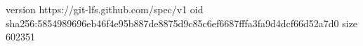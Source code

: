version https://git-lfs.github.com/spec/v1
oid sha256:5854989696eb46f4e95b887de8875d9c85c6ef6687fffa3fa9d4dcf66d52a7d0
size 602351
